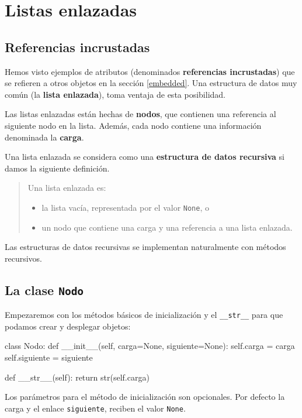 
\chapter{Listas enlazadas}

\label{lista} 

\section{Referencias incrustadas}

  
   

Hemos visto ejemplos de atributos (denominados \textbf{referencias
incrustadas}) que se refieren a otros objetos en la sección \ref{embedded}.
Una estructura de datos muy común (la \textbf{lista enlazada}), toma
ventaja de esta posibilidad.

Las listas enlazadas están hechas de \textbf{nodos}, que contienen
una referencia al siguiente nodo en la lista. Además, cada nodo contiene
una información denominada la \textbf{carga}.

Una lista enlazada se considera como una \textbf{estructura de datos
recursiva} si damos la siguiente definición.
\begin{quote}
Una lista enlazada es: 

\begin{itemize}
\item la lista vacía, representada por el valor \texttt{None}, o
\item un nodo que contiene una carga y una referencia a una lista enlazada.
\end{itemize}
\end{quote}
 

Las estructuras de datos recursivas se implementan naturalmente con
métodos recursivos.

\section{La clase \texttt{Nodo} }

 

Empezaremos con los métodos básicos de inicialización y el \texttt{\_\_str\_\_}
para que podamos crear y desplegar objetos:

\beforeverb 
\begin{pythoncode}
class Nodo:
  def __init__(self, carga=None, siguiente=None):
    self.carga = carga
    self.siguiente  = siguiente

  def __str__(self):
    return str(self.carga)
\end{pythoncode}
\afterverb Los parámetros para el método de inicialización son opcionales.
Por defecto la carga y el enlace \texttt{siguiente}, reciben el valor
\texttt{None}.

